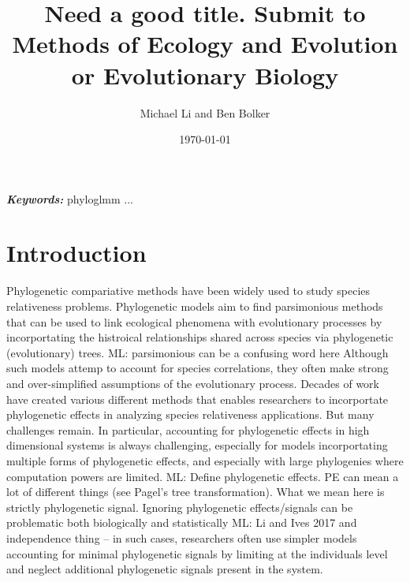 \documentclass[12pt]{article}
\title{Need a good title. Submit to Methods of Ecology and Evolution or Evolutionary Biology}
\author{Michael Li and Ben Bolker}
\date{\today}
\providecommand{\keywords}[1]{\textbf{\textit{Keywords:}} #1}
\begin{document}
\newcommand{\dbic}{\ensuremath \Delta \textrm{BIC}}

\newcommand{\bmbhide}[1]{}
\newcommand{\bmb}[1]{{\color{blue} BB: #1}}

\newcommand{\fref}[1]{Figure~\ref{fig:#1}}

\newcommand{\ml}[1]{{\color{red} ML: #1}}

\newcommand{\add}[1]{{\color{blue} ADD: #1}}

\maketitle

\doublespacing

\keywords{phyloglmm ... }

\section{Introduction}

Phylogenetic compariative methods have been widely used to study species relativeness problems.
Phylogenetic models aim to find parsimonious methods that can be used to link ecological phenomena with evolutionary processes by incorportating the histroical relationships shared across species via phylogenetic (evolutionary) trees. 
\ml{parsimonious can be a confusing word here}
Although such models attemp to account for species correlations, they often make strong and over-simplified assumptions of the evolutionary process. 
Decades of work have created various different methods that enables researchers to incorportate phylogenetic effects in analyzing species relativeness applications.
But many challenges remain.
In particular, accounting for phylogenetic effects in high dimensional systems is always challenging, especially for models incorportating multiple forms of phylogenetic effects, and especially with large phylogenies where computation powers are limited.
\ml{Define phylogenetic effects. PE can mean a lot of different things (see Pagel's tree transformation). What we mean here is strictly phylogenetic signal.}
Ignoring phylogenetic effects/signals can be problematic both biologically and statistically \ml{Li and Ives 2017 and independence thing} --
in such cases, researchers often use simpler models accounting for minimal phylogenetic signals by limiting at the individuals level and neglect additional phylogenetic signals present in the system.
\end{document}
